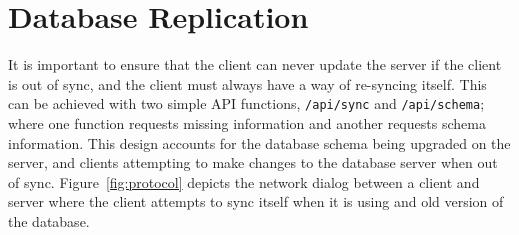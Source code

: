 \documentclass[journal]{IEEEtran}
\begin{document}
\section{Database Replication} \label{sec:db}

It is important to ensure that the client can never update the server if the client is out of sync, and the client must always have a way of re-syncing itself.
This can be achieved with two simple API functions, \texttt{/api/sync} and \texttt{/api/schema}; where one function requests missing information and another requests schema information. This design accounts for the database schema being upgraded on the server, and clients attempting to make changes to the database server when out of sync. Figure~\ref{fig:protocol} depicts the network dialog between a client and server where the client attempts to sync itself when it is using and old version of the database. 
\end{document}
